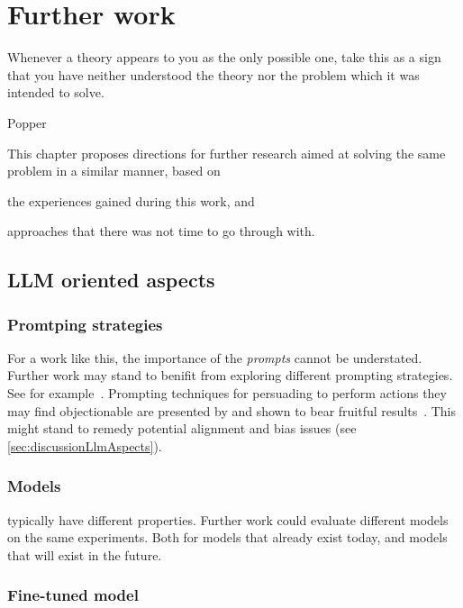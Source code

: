 \chapter{Further work}\label{chp:furtherWork}

\epigraph{Whenever a theory appears to you as the only possible one, take this as a sign that you have neither understood the theory nor the problem which it was intended to solve.}{Popper}

This chapter proposes directions for further research aimed at solving the same problem in a similar
manner, based on \begin{inparaenum}
    \item the experiences gained during this work, and
    \item approaches that there was not time to go through with.
\end{inparaenum}

\section{LLM oriented aspects}

\subsection{Promtping strategies}

For a work like this, the importance of the \emph{prompts} cannot be understated. Further work may
stand to benifit from exploring different prompting strategies. See for
example~\cite{girayPromptEngineering23}. Prompting techniques for persuading  to
perform actions they may find objectionable are presented by \citeauthor{meincke2025overtale} and
shown to bear fruitful results~\cite[1]{meincke2025overtale}. This might stand to remedy potential
alignment and bias issues (see \cref{sec:discussionLlmAspects}).

\subsection{Models}

 typically have different properties. Further work could evaluate different models
on the same experiments. Both for models that already exist today, and models that will exist in the future.

\subsection{Fine-tuned model}

